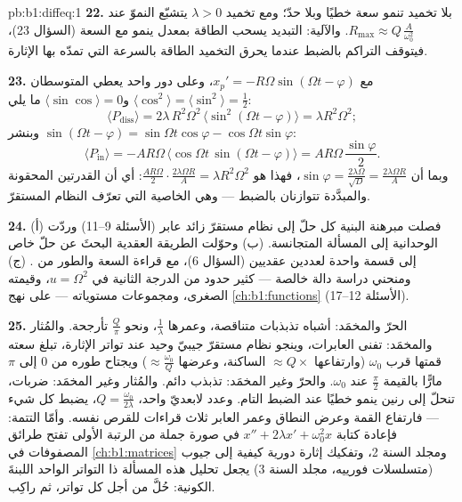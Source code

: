 \begin{solution}{pb:b1:diffeq:1}
\textbf{22.} بلا تخميد تنمو سعة  خطيًا
وبلا حدّ؛ ومع تخميد $\lambda > 0$ يتشبّع النموّ
عند $R_{\max} \approx Q\,\frac A{\omega_0^2}$. والآلية:
التبديد يسحب الطاقة بمعدل ينمو مع السعة
(السؤال 23)، فيتوقف التراكم بالضبط عندما يحرق التخميد
الطاقة بالسرعة التي تمدّه بها الإثارة.

\textbf{23.} مع $x_p' = -R\Omega\sin(\Omega t - \varphi)$، وعلى
دور واحد يعطي المتوسطان $\langle\cos^2\rangle =
\langle\sin^2\rangle = \frac12$ و$\langle\sin\cos\rangle = 0$
ما يلي:
\[
\langle P_{\mathrm{diss}}\rangle
= 2\lambda\,R^2\Omega^2\,\langle\sin^2(\Omega t -
\varphi)\rangle = \lambda R^2\Omega^2 ;
\]
وبنشر $\sin(\Omega t - \varphi) = \sin\Omega t\cos\varphi
- \cos\Omega t\sin\varphi$:
\[
\langle P_{\mathrm{in}}\rangle
= -AR\Omega\,\bigl\langle\cos\Omega t\,\sin(\Omega t -
\varphi)\bigr\rangle
= AR\Omega\,\frac{\sin\varphi}2 .
\]
وبما أن $\sin\varphi = \frac{2\lambda\Omega}{\sqrt D} =
\frac{2\lambda\Omega R}A$، فهذا هو $\frac{AR\Omega}2 \cdot
\frac{2\lambda\Omega R}A = \lambda R^2\Omega^2$: أي أن القدرتين
المحقونة والمبدَّدة تتوازنان بالضبط --- وهي الخاصية التي تعرّف
النظام المستقرّ.

\textbf{24.} (أ) فصلت مبرهنة البنية كل حلّ إلى
نظام مستقرّ زائد عابر (الأسئلة 9--11) وردّت
الوحدانية إلى المسألة المتجانسة. (ب) وحوّلت الطريقة العقدية
البحثَ عن حلّ خاص إلى قسمة واحدة لعددين
عقديين (السؤال 6)، مع قراءة السعة والطور من
 . (ج) ومنحني  دراسة دالة
خالصة --- كثير حدود من الدرجة الثانية في $u = \Omega^2$، وقيمته الصغرى،
ومجموعات مستوياته --- على نهج \cref{ch:b1:functions}
(الأسئلة 12--17).

\textbf{25.} الحرّ والمخمَد: أشباه تذبذبات متناقصة،
وعمرها $\frac1\lambda$، ونحو $\frac Q\pi$ تأرجحة. والمُثار
والمخمَد: تفنى العابرات، وينجو نظام مستقرّ جيبيّ وحيد
عند تواتر الإثارة، تبلغ سعته قمتها قرب
$\omega_0$ (وارتفاعها $\approx Q \times$ الساكنة، وعرضها $\approx
\frac{\omega_0}Q$) ويجتاح طوره من $0$ إلى $\pi$ مارًّا بالقيمة $\frac\pi2$ عند $\omega_0$. والحرّ وغير المخمَد: تذبذب
دائم. والمُثار وغير المخمَد: ضربات، تنحلّ إلى
رنين ينمو خطيًا عند الضبط التام. وعدد لابعديّ
واحد، $Q = \frac{\omega_0}{2\lambda}$، يضبط كل شيء ---
فارتفاع القمة وعرض النطاق وعمر العابر ثلاث قراءات
للقرص نفسه. وأمّا التتمة: فإعادة كتابة $x'' + 2\lambda x' +
\omega_0^2x$ في صورة جملة من الرتبة الأولى تفتح طرائق المصفوفات في
\cref{ch:b1:matrices} ومجلد السنة 2، وتفكيك إثارة
دورية كيفية إلى جيوب (متسلسلات فورييه، مجلد السنة 3)
يجعل تحليل هذه المسألة ذا التواتر الواحد اللبنةَ
الكونية: حُلَّ من أجل كل تواتر، ثم راكِب.
\end{solution}
